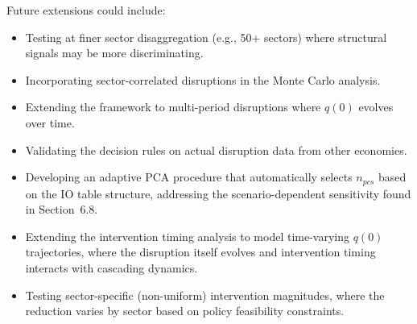 Future extensions could include:

\begin{itemize}
    \item Testing at finer sector disaggregation (e.g., 50+ sectors) where structural signals may be more discriminating.
    \item Incorporating sector-correlated disruptions in the Monte Carlo analysis.
    \item Extending the framework to multi-period disruptions where $q(0)$ evolves over time.
    \item Validating the decision rules on actual disruption data from other economies.
    \item Developing an adaptive PCA procedure that automatically selects $n_{\textit{pcs}}$ based on the IO table structure, addressing the scenario-dependent sensitivity found in Section~6.8.
    \item Extending the intervention timing analysis to model time-varying $q(0)$ trajectories, where the disruption itself evolves and intervention timing interacts with cascading dynamics.
    \item Testing sector-specific (non-uniform) intervention magnitudes, where the reduction varies by sector based on policy feasibility constraints.
\end{itemize}

\newpage
